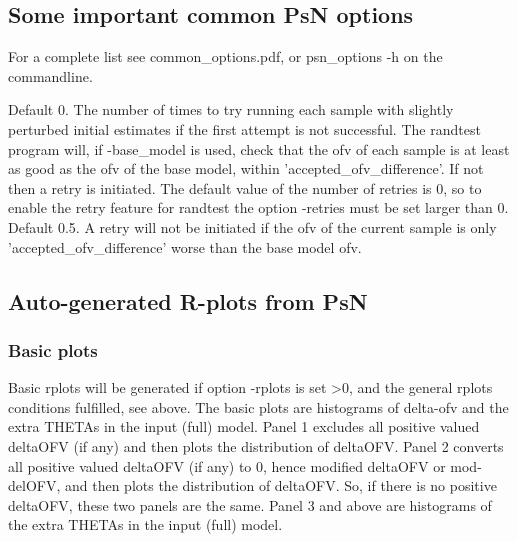 \subsection{Some important common PsN options}
For a complete list see common\_options.pdf, 
or psn\_options -h on the commandline.

\begin{optionlist}
Default 0. The number of times to try running each sample with slightly perturbed initial estimates if the first attempt is not successful.
The randtest program will, if -base\_model is used, check that the ofv of each sample is at least as good as the ofv of
the base model, within 'accepted\_ofv\_difference'. If not then a retry is initiated. The default value of the number of
retries is 0, so to enable the retry feature for randtest the option -retries must be set larger than 0. 
\nextopt
{}
Default 0.5. A retry will not be initiated if the ofv of the current sample is only 'accepted\_ofv\_difference' worse than
the base model ofv.
\nextopt
\end{optionlist}


\subsection{Auto-generated R-plots from PsN}
\newcommand{\rplotsconditions}{The default randtest template 
requires that option -base\_model was used, and also 
that R libraries
ggplot2, reshape2, gridExtra, scales, MASS and plotrix are installed.
It is assumed that input (full) model has more THETAs than base (reduced) model,
and that the additional THETAs are the ones relevant for the
randomization column.
If the conditions are not fulfilled then no pdf will be generated,
see the .Rout file in the main run directory for error messages.}


\subsubsection*{Basic plots}
Basic rplots will be generated if option -rplots is set >0,
and the general rplots conditions fulfilled, see above.
The basic plots are
histograms of delta-ofv and the extra THETAs in the input (full) model.
Panel 1 excludes all positive valued deltaOFV (if any) 
and then plots the distribution of deltaOFV. 
Panel 2 converts all positive valued deltaOFV (if any) to 0, 
hence modified deltaOFV or mod-delOFV, 
and then plots the distribution of deltaOFV. 
So, if there is no positive deltaOFV, these two panels are the same.
Panel 3 and above are histograms of the extra THETAs in the input (full) model.
